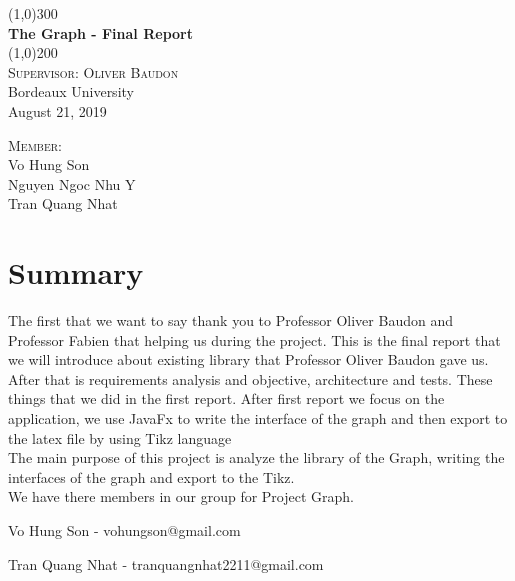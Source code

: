 \documentclass[a4paper,10pt]{article}
\begin{document}
\begin{titlepage} 
	\begin{center}
	\line(1,0){300}\\
	[0.25in]
	\huge{\bfseries The Graph - Final Report}\\
	[2mm]
	\line(1,0){200}\\
	[1cm]
	\textsc{\Large Supervisor: Oliver Baudon}\\
	\textmd{\Large Bordeaux University \\
	August 21, 2019}\\
	[13cm]
	\end{center}
	\begin{flushright}
	\textsc{Member: \\}
	Vo Hung Son \\
	Nguyen Ngoc Nhu Y \\
	Tran Quang Nhat \\
	\end{flushright}
\end{titlepage}
%

\section*{Summary}

The first that we want to say thank you to Professor Oliver Baudon and Professor Fabien that helping us during the project. This is the final report that we will introduce about existing library that Professor Oliver Baudon gave us. After that is requirements analysis and objective, architecture and tests. These things that we did in the first report. After first report we focus on the application, we use JavaFx to write the interface of the graph and then export to the latex file by using Tikz language\\
The main purpose of this project is analyze the library of the Graph, writing the interfaces of the graph and export to the Tikz.\\


We have there members in our group for Project Graph.

Vo Hung Son - vohungson@gmail.com

Tran Quang Nhat - tranquangnhat2211@gmail.com
\end{document}
